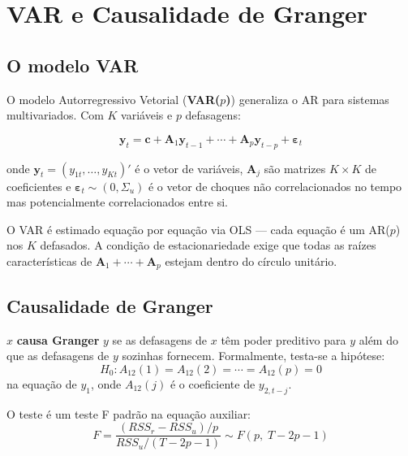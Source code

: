 \chapter{VAR e Causalidade de Granger}
\label{cap:var}

\section{O modelo VAR}

O modelo Autorregressivo Vetorial (\textbf{VAR($p$)}) generaliza o AR para
sistemas multivariados. Com $K$ variáveis e $p$ defasagens:

\[
  \mathbf{y}_t = \mathbf{c} + \mathbf{A}_1 \mathbf{y}_{t-1}
                 + \cdots + \mathbf{A}_p \mathbf{y}_{t-p}
                 + \boldsymbol{\varepsilon}_t
\]

onde $\mathbf{y}_t = (y_{1t}, \ldots, y_{Kt})'$ é o vetor de variáveis,
$\mathbf{A}_j$ são matrizes $K \times K$ de coeficientes e
$\boldsymbol{\varepsilon}_t \sim (0, \Sigma_u)$ é o vetor de choques não
correlacionados no tempo mas potencialmente correlacionados entre si.

O VAR é estimado equação por equação via OLS — cada equação é um AR($p$)
nos $K$ defasados. A condição de estacionariedade exige que todas as raízes
características de $\mathbf{A}_1 + \cdots + \mathbf{A}_p$ estejam dentro do
círculo unitário.

\section{Causalidade de Granger}

$x$ \textbf{causa Granger} $y$ se as defasagens de $x$ têm poder preditivo
para $y$ além do que as defasagens de $y$ sozinhas fornecem. Formalmente,
testa-se a hipótese:
\[
  H_0: A_{12}(1) = A_{12}(2) = \cdots = A_{12}(p) = 0
\]
na equação de $y_1$, onde $A_{12}(j)$ é o coeficiente de $y_{2,t-j}$.

O teste é um teste F padrão na equação auxiliar:
\[
  F = \frac{(RSS_r - RSS_u)/p}{RSS_u / (T - 2p - 1)} \sim F(p,\; T-2p-1)
\]

